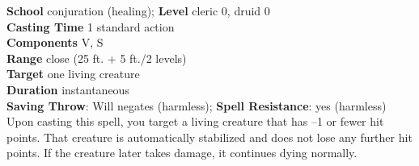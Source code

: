 \textbf{School }conjuration (healing); \textbf{Level }cleric 0, druid 0\\
\textbf{Casting Time }1 standard action\\
\textbf{Components }V, S\\
\textbf{Range }close (25 ft. + 5 ft./2 levels)\\
\textbf{Target} one living creature\\
\textbf{Duration }instantaneous\\
\textbf{Saving Throw}: Will negates (harmless); \textbf{Spell Resistance}: yes (harmless)\\
Upon casting this spell, you target a living creature that has –1 or fewer hit points. That creature is automatically stabilized and does not lose any further hit points. If the creature later takes damage, it continues dying normally.\\
